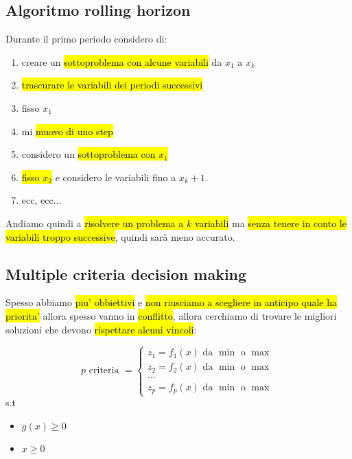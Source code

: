 \subsection{Algoritmo rolling horizon}

Durante il primo periodo considero di:

\begin{enumerate}
    \item creare un \hl{sottoproblema con alcune variabili} da $x_1$ a $x_k$
    \item \hl{trascurare le variabili dei periodi successivi}
    \item fisso $x_1$
    \item mi \hl{muovo di uno step}
    \item considero un \hl{sottoproblema con $x_1$}
    \item \hl{fisso $x_2$} e considero le variabili fino a $x_k+1$.
    \item ecc, ecc...
\end{enumerate}

Andiamo quindi a \hl{risolvere un problema a $k$ variabili} ma \hl{senza tenere in conto le variabili troppo successive}, quindi sarà meno accurato.


\subsection{Multiple criteria decision making}

Spesso abbiamo \hl{piu' obbiettivi} e \hl{non riusciamo a scegliere in anticipo quale ha priorita'} allora spesso vanno in \hl{conflitto}, allora cerchiamo di trovare le migliori soluzioni che devono \hl{rispettare alcuni vincoli}:

$$p \text{ criteria } =
\begin{cases} 
    z_1 = f_1(x) \text{ da }\min \text{ o }\max \\ 
    z_2 = f_2(x) \text{ da }\min \text{ o }\max \\ 
    ... \\
    z_p = f_p(x) \text{ da }\min \text{ o }\max
\end{cases}
$$
s.t

\begin{itemize}
    \item $g(x) \geq 0$
    \item $x \geq 0$
\end{itemize}



